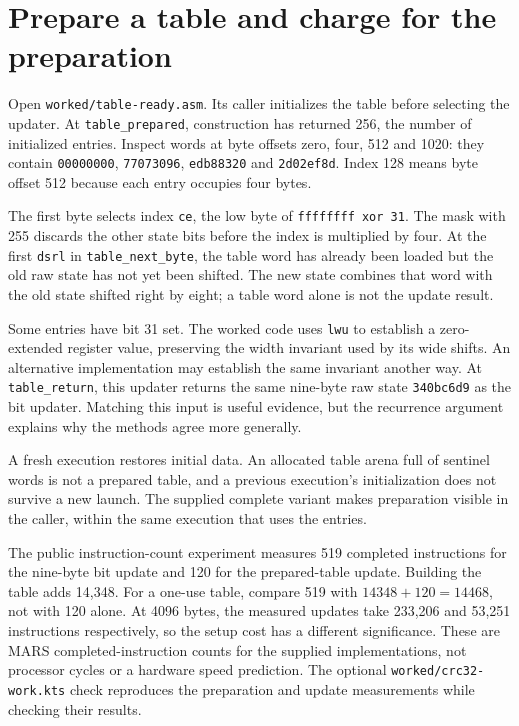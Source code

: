 \section{Prepare a table and charge for the preparation}

Open \texttt{worked/\allowbreak table-ready.asm}. Its caller initializes the
table before selecting the updater. At \texttt{table\_prepared}, construction
has returned 256, the number of initialized entries. Inspect words at byte
offsets zero, four, 512 and 1020: they contain \texttt{00000000},
\texttt{77073096}, \texttt{edb88320} and \texttt{2d02ef8d}. Index 128 means
byte offset 512 because each entry occupies four bytes.

The first byte selects index \texttt{ce}, the low byte of
\texttt{ffffffff xor 31}. The mask with 255 discards the other state bits before
the index is multiplied by four. At the first \texttt{dsrl} in
\texttt{table\_next\_byte}, the table word has already been loaded but the old
raw state has not yet been shifted. The new state combines that word with the
old state shifted right by eight; a table word alone is not the update result.

Some entries have bit 31 set. The worked code uses \texttt{lwu} to establish
a zero-extended register value, preserving the width invariant used by its wide
shifts. An alternative implementation may establish the same invariant another
way. At \texttt{table\_return}, this updater returns the same nine-byte raw state
\texttt{340bc6d9} as the bit updater. Matching this input is useful evidence,
but the recurrence argument explains why the methods agree more generally.

A fresh execution restores initial data. An allocated table arena full of
sentinel words is not a prepared table, and a previous execution's initialization
does not survive a new launch. The supplied complete variant makes preparation
visible in the caller, within the same execution that uses the entries.

The public instruction-count experiment measures 519 completed instructions for
the nine-byte bit update and 120 for the prepared-table update. Building the table
adds 14,348. For a one-use table, compare 519 with $14348+120=14468$, not with
120 alone. At 4096 bytes, the measured updates take 233,206 and 53,251 instructions
respectively, so the setup cost has a different significance. These are MARS
completed-instruction counts for the supplied implementations, not processor
cycles or a hardware speed prediction. The optional
\texttt{worked/\allowbreak crc32-work.kts} check reproduces the preparation and
update measurements while checking their results.

